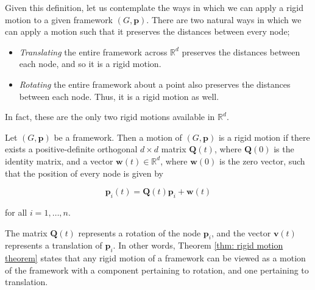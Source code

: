\begin{flushleft}
Given this definition, let us contemplate the ways in which we can apply a rigid motion to a given framework $(G,\mathbf{p})$. There are two natural ways in which we can apply a motion such that it preserves the distances between every node;
\end{flushleft}

\begin{itemize}
    \item \textit{Translating} the entire framework across $\mathbb{R}^d$ preserves the distances between each node, and so it is a rigid motion.
    \vspace{-3mm}
    \item \textit{Rotating} the entire framework about a point also preserves the distances between each node. Thus, it is a rigid motion as well.
    
\end{itemize}

\begin{flushleft}
In fact, these are the only two rigid motions available in $\mathbb{R}^d$. 
\end{flushleft}

\begin{theorem}
\label{thm: rigid motion theorem}
\cite{textbook} Let $(G,\mathbf{p})$ be a framework. Then a motion of $(G,\mathbf{p})$ is a rigid motion if there exists a positive-definite orthogonal $d \times d$ matrix $\mathbf{Q}(t)$, where $\mathbf{Q}(0)$ is the identity matrix, and a vector $\mathbf{w}(t) \in \mathbb{R}^d$, where $\mathbf{w}(0)$ is the zero vector, such that the position of every node is given by 

\[
\mathbf{p}_i(t) = \mathbf{Q}(t)\mathbf{p}_i + \mathbf{w}(t)
\]

\noindent
for all $i = 1, \hdots, n$.
\end{theorem}

\begin{flushleft}
The matrix $\mathbf{Q}(t)$ represents a rotation of the node $\textbf{p}_i$, and the vector $\mathbf{v}(t)$ represents a translation of $\textbf{p}_i$. In other words, Theorem \ref{thm: rigid motion theorem} states that any rigid motion of a framework can be viewed as a motion of the framework with a component pertaining to rotation, and one pertaining to translation.
\end{flushleft}


